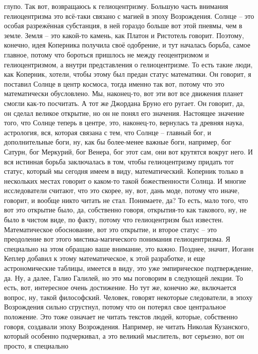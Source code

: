 глупо. Так вот, возвращаюсь к гелиоцентризму. Большую часть внимания
гелиоцентризма это всё-таки связано с магией в эпоху Возрождения. Солнце – это
особая разрежённая субстанция, в ней гораздо больше вот этой пневмы, чем в
земле. Земля – это какой-то камень, как Платон и Ристотель говорит. Поэтому,
конечно, идея Коперника получила своё одобрение, и тут началась борьба, самое
главное, потому что бороться пришлось не между геоцентризмом и гелиоцентризмом,
а внутри представления о гелиоцентризме. То есть такие люди, как Коперник,
хотели, чтобы этому был предан статус математики. Он говорит, я поставил Солнце
в центр космоса, тогда именно так вот, потому что это математически обусловлено.
Мы, наконец-то, вот эти вот все движения планет смогли как-то посчитать. А тот
же Джордана Бруно его ругает. Он говорит, да, он сделал великое открытие, но он
не понял его значения. Настоящее значение того, что Солнце теперь в центре, это,
наконец-то, вернулась та древняя наука, астрология, вся, которая связана с тем,
что Солнце – главный бог, и дополнительные боги, ну, как бы более-менее важные
боги, например, бог Сатурн, бог Меркурий, бог Венера, бог этот сам, они вот
крутятся вокруг него. И вся истинная борьба заключалась в том, чтобы
гелиоцентризму придать тот статус, который мы сегодня имеем в виду,
математический. Коперник только в нескольких местах говорит о каком-то такой
божественности Солнца. И многие исследователи считают, что это скорее, ну, вот,
дань моде, потому что иначе, говорит, и вообще никто читать не стал. Понимаете,
да? То есть, мало того, что вот это открытие было, да, собственно говоря,
открытия-то как такового, ну, не было в чистом виде, по факту, потому что
гелиоцентризм был известен. Математическое обоснование, вот это открытие, и
второе статус – это преодоление вот этого мистика-магического понимания
гелиоцентризма. Я специально на этом обращаю ваше внимание, это важно. Позднее,
значит, Иоганн Кеплер добавил к этому математическое, к этой разработке, и еще
астрономические таблицы, имеется в виду, это уже эмпирическое подтверждение, да.
Ну, а далее, Галио Галилей, но это мы поговорим в следующей лекции. То есть,
вот, интересное очень достижение. Но тут же, конечно же, включается вопрос, ну,
такой философский. Человек, говорят некоторые следователи, в эпоху Возрождения
сильно сгрустнул, потому что он потерял свое центральное положение. Это тоже
означает не читать текстов людей, которые, собственно говоря, создавали эпоху
Возрождения. Например, не читать Николая Кузанского, который особенно
подчеркивал, а это великий мыслитель, вот серьезно, вот он просто, я специально
